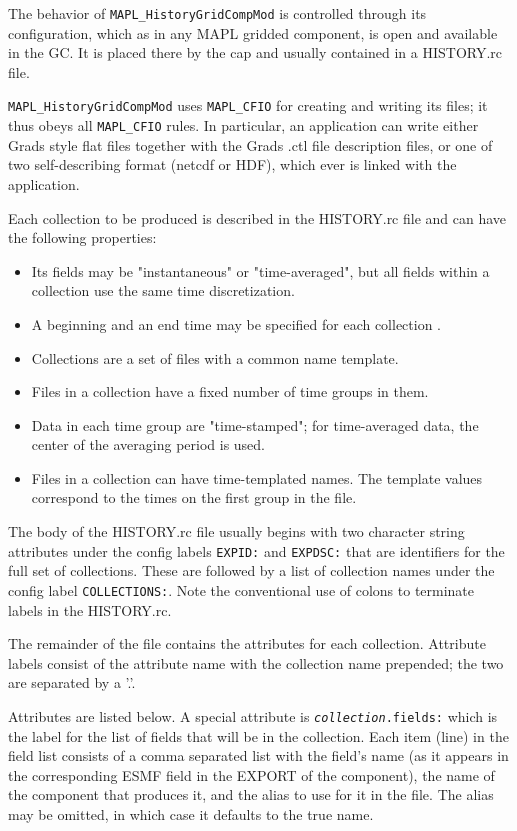 The behavior of  {\tt MAPL\_HistoryGridCompMod} is controlled through its configuration,
which as in any MAPL gridded component, is open and available in the GC. It is placed
there by the cap and usually contained in a HISTORY.rc file.

{\tt MAPL\_HistoryGridCompMod} uses {\tt MAPL\_CFIO} for creating and writing its files;
it thus obeys all {\tt MAPL\_CFIO} rules. In particular, an application can write either
Grads style flat files together with the Grads .ctl file description files, or
one of two self-describing format (netcdf or HDF), which ever is linked with the 
application.

Each collection  to be produced is described in the HISTORY.rc file and can have the
following properties:

\begin{itemize}
\item Its fields may be "instantaneous" or "time-averaged", but all fields within
  a collection use the same time discretization. 
\item A beginning and an end time may be specified for each collection .
\item Collections are a set of files with a common name template. 
\item Files in a collection have a fixed number of time groups in them.
\item Data in each time group are "time-stamped"; for time-averaged data,
  the center of the averaging period is used.
\item Files in a collection can have time-templated names. The template
  values correspond to the times on the first group in the file.
\end{itemize}

The body of the HISTORY.rc file usually begins with two
character string attributes under the config labels {\tt EXPID:} and {\tt EXPDSC:}
that are identifiers for the full set of collections. These are followed
by a list of collection names under the config label {\tt COLLECTIONS:}. Note
the conventional use of colons to terminate labels in the HISTORY.rc.

The remainder of the file contains the attributes for each collection.
Attribute labels consist of the attribute name with the collection name
prepended; the two are separated by a '.'.

Attributes are listed below. A special attribute is {\tt {\em collection}.fields:}
which is the label for the list of fields that will be in the collection.
Each item (line) in the field list consists of a comma separated list
with the field's name (as it appears in
the corresponding ESMF field in the EXPORT of the component), the name of the component that
produces it, and the alias to use for it in the file. The alias may be omitted, in which case
it defaults to the true name.

